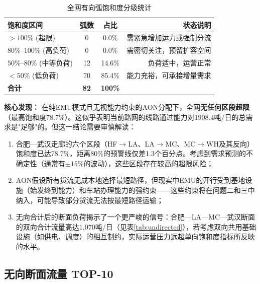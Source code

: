 \documentclass[12pt,a4paper,fontset=none]{ctexart}
\begin{document}
\begin{table}[H]
\centering
\caption{全网有向弧饱和度分级统计}
\begin{tabular}{lccr}
\toprule
\textbf{饱和度区间} & \textbf{弧数} & \textbf{占比} & \textbf{状态说明} \\
\midrule
$>100\%$ (超限)    & 0  & 0.0\%  & 需紧急增加运力或强制分流 \\
$80\%$--$100\%$ (高负荷) & 0  & 0.0\%  & 需密切关注，预留扩容空间 \\
$50\%$--$80\%$ (中等负荷) & 12 & 14.6\% & 负荷适中，运营正常 \\
$<50\%$ (低负荷)   & 70 & 85.4\% & 能力充裕，可承接增量需求 \\
\midrule
\textbf{合计}       & \textbf{82} & \textbf{100\%} & \\
\bottomrule
\end{tabular}
\end{table}

\textbf{核心发现：} 在纯EMU模式且无视能力约束的AON分配下，全网\textbf{无任何区段超限}（最高饱和度78.7\%）。这似乎表明当前路网的线路通过能力对1908.4吨/日的总需求是"足够"的。但这一结论需要审慎解读：

\begin{enumerate}[leftmargin=*]
    \item 合肥—武汉走廊的六个区段（HF$\to$LA、LA$\to$MC、MC$\to$WH及其反向）饱和度已达78.7\%，距离80\%的预警线仅差1.3个百分点。考虑到需求预测的不确定性（通常有$\pm 15\%$的波动），这些区段存在较高的超限风险；
    \item AON假设所有货流无成本地选择最短路径，但现实中EMU的开行受到基地设施（始发终到能力）和车站办理能力的强约束——这些约束将在问题二和三中纳入，可能导致部分货流无法按最短路径运输；
    \item 无向合计后的断面负荷揭示了一个更严峻的信号：合肥—LA—MC—武汉断面的双向合计流量高达1,070吨/日（见表\ref{tab:undirected}），若考虑双向共用基础设施（如供电、调度）的相互制约，实际运营压力远超单向饱和度指标所反映的水平。
\end{enumerate}

\subsection{无向断面流量 TOP-10}
\end{document}
